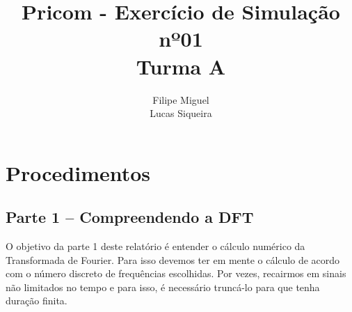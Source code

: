 \documentclass[a4paper]{article}
\title{Pricom - Exercício de Simulação nº01\\Turma A}
\author{Filipe Miguel\\
	Lucas Siqueira}
\begin{document}
\maketitle


\section{Procedimentos}
\subsection*{Parte 1 – Compreendendo a DFT}
	O objetivo da parte 1 deste relatório é entender o cálculo numérico da Transformada de Fourier. Para isso devemos ter em mente o cálculo de acordo com o número discreto de frequências escolhidas. Por vezes, recairmos em sinais não limitados no tempo e para isso, é necessário truncá-lo para que tenha duração finita.
\end{document}
